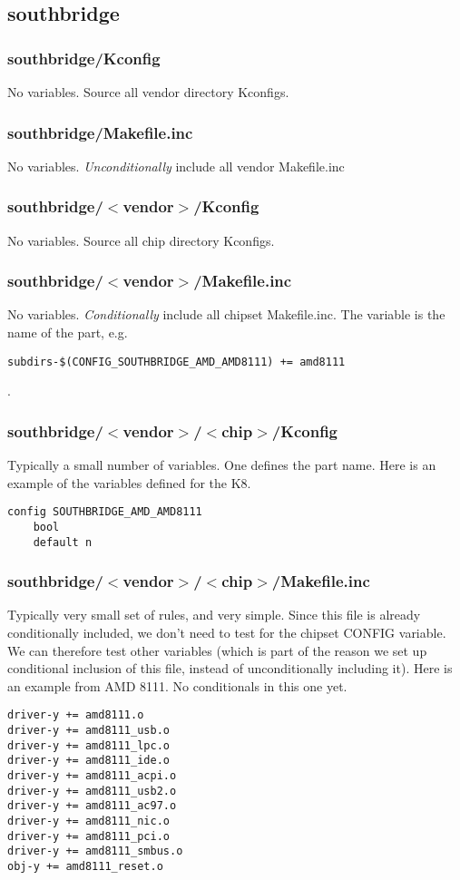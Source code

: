 \documentclass[10pt,letterpaper]{article}
\begin{document}
\subsection{southbridge}
\subsubsection{southbridge/Kconfig}
No variables. Source all vendor directory Kconfigs.
\subsubsection{southbridge/Makefile.inc}
No variables. {\em Unconditionally} include all vendor Makefile.inc
\subsubsection{southbridge/$<$vendor$>$/Kconfig}
No variables. Source all chip directory Kconfigs.
\subsubsection{southbridge/$<$vendor$>$/Makefile.inc}
No variables. {\em Conditionally} include all chipset Makefile.inc. The variable
is the name of the part, e.g.
\begin{verbatim}
subdirs-$(CONFIG_SOUTHBRIDGE_AMD_AMD8111) += amd8111
\end{verbatim}
.
\subsubsection{southbridge/$<$vendor$>$/$<$chip$>$/Kconfig}
Typically a small number of variables. One defines the part name. Here is an example
of the variables defined for the K8.
\begin{verbatim}
config SOUTHBRIDGE_AMD_AMD8111
	bool
	default n

\end{verbatim}
\subsubsection{southbridge/$<$vendor$>$/$<$chip$>$/Makefile.inc}
Typically very small set of rules, and very simple.
Since this file is already conditionally included,
we don't need to test for the chipset CONFIG variable. We
can therefore test other variables (which is part of the reason
we set up conditional inclusion of this file, instead
of unconditionally including it). Here is an example from AMD 8111.
No conditionals in this one yet.
\begin{verbatim}
driver-y += amd8111.o
driver-y += amd8111_usb.o
driver-y += amd8111_lpc.o
driver-y += amd8111_ide.o
driver-y += amd8111_acpi.o
driver-y += amd8111_usb2.o
driver-y += amd8111_ac97.o
driver-y += amd8111_nic.o
driver-y += amd8111_pci.o
driver-y += amd8111_smbus.o
obj-y += amd8111_reset.o
\end{verbatim}
\end{document}
